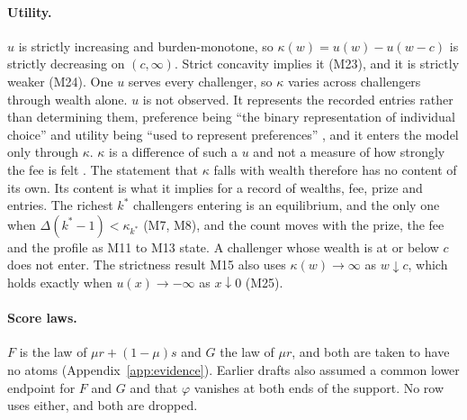 \paragraph{Utility.} $u$ is strictly increasing and burden-monotone, so
$\kappa(w)=u(w)-u(w-c)$ is strictly decreasing on $(c,\infty)$. Strict
concavity implies it (M23), and it is strictly weaker (M24). One $u$ serves
every challenger, so $\kappa$ varies across challengers through wealth alone.
$u$ is not observed. It represents the recorded entries rather than
determining them, preference being ``the binary representation of individual
choice'' \citep[p.~253]{Sen1973} and utility being ``used to represent
preferences'' \citep[p.~532]{Schoemaker1982}, and it enters the model only
through $\kappa$. $\kappa$ is a difference of such a $u$ and not a measure of
how strongly the fee is felt \citep[p.~533]{Schoemaker1982}. The statement
that $\kappa$ falls with wealth therefore has no content of its own. Its
content is what it implies for a record of wealths, fee, prize and entries.
The richest $k^*$ challengers entering is an equilibrium, and the only one
when $\Delta(k^*-1)<\kappa_{k^*}$ (M7, M8), and the count moves with the prize,
the fee and the profile as M11 to M13 state. A challenger whose wealth is at
or below $c$ does not enter. The strictness result M15 also uses
$\kappa(w)\to\infty$ as $w\downarrow c$, which holds exactly when
$u(x)\to-\infty$ as $x\downarrow0$ (M25).

\paragraph{Score laws.} $F$ is the law of $\mu r+(1-\mu)s$ and $G$ the law of
$\mu r$, and both are taken to have no atoms (Appendix~\ref{app:evidence}).
Earlier drafts also assumed a common lower endpoint for $F$ and $G$ and that
$\varphi$ vanishes at both ends of the support. No row uses either, and both
are dropped.

